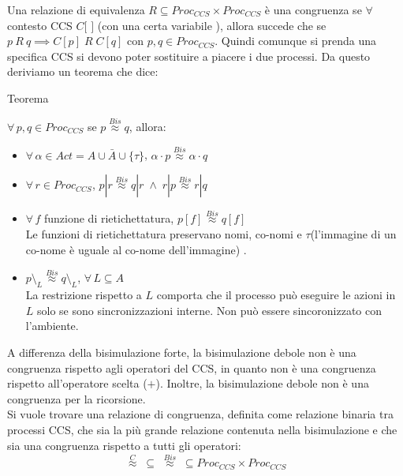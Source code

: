 Una relazione di equivalenza $R\subseteq Proc_{CCS}\times Proc_{CCS}$ è una congruenza se $\forall$ contesto CCS $C[$ \textbullet $ ]$ (con una certa variabile \textbullet), allora succede che se $p\ R\ q \implies C[p]\; R \;C[q]$ con $p,q\in Proc_{CCS}$. Quindi comunque si prenda una specifica CCS si devono poter sostituire a piacere i due processi. Da questo deriviamo un teorema che dice:
\begin{teorema}{Teorema}{}
\par
    $\forall\,p,q\in Proc_{CCS}$ se $p \stackrel{Bis}{\approx} q$, allora:
    \begin{itemize}
        \item $\forall\, \alpha \in Act=A\cup\bar{A}\cup\{\tau\}$,	$\alpha \cdot p \stackrel{Bis}{\approx} \alpha \cdot q$
        \item  $\forall\,r\in Proc_{CCS}$,	$p|r \stackrel{Bis}{\approx} q|r \; \land \; r|p \stackrel{Bis}{\approx} r|q$
        \item $\forall\,f$ funzione di rietichettatura,	$p[f] \stackrel{Bis}{\approx} q[f]$\\
            Le funzioni di rietichettatura preservano nomi, co-nomi e $\tau$(l’immagine di un co-nome è uguale al co-nome dell’immagine) .
        \item $p\setminus_L \stackrel{Bis}{\approx} q \setminus_L$,	$\forall\,L\subseteq A$\\
            La restrizione rispetto a $L$ comporta che il processo può eseguire le azioni in $L$ solo se sono sincronizzazioni interne. Non può essere sincoronizzato con l'ambiente.
    \end{itemize}
\end{teorema}
A differenza della bisimulazione forte, la bisimulazione debole non è una congruenza rispetto agli operatori del CCS, in quanto non è una congruenza rispetto all’operatore scelta ($+$). Inoltre, la bisimulazione debole non è una congruenza per la ricorsione.\\

Si vuole trovare una relazione di congruenza, definita come relazione binaria tra processi CCS, che sia la più grande relazione contenuta nella bisimulazione e che sia una congruenza rispetto a tutti gli operatori: $$\stackrel{C}{\approx} \; \subseteq \; \stackrel{Bis}{\approx} \; \subseteq Proc_{CCS}\times Proc_{CCS}$$

